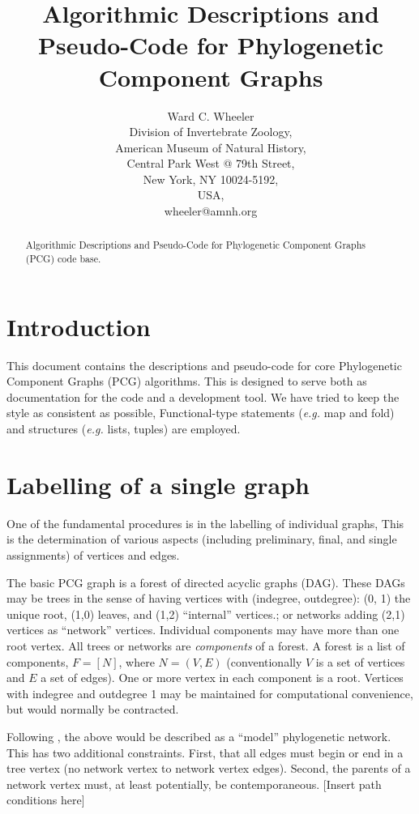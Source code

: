 \documentclass[11pt]{article}
\title{Algorithmic Descriptions and Pseudo-Code for Phylogenetic Component Graphs}
\author{Ward C. Wheeler\\
		Division of Invertebrate Zoology,\\
		American Museum of Natural History,\\
		Central Park West @ 79th Street,\\
		New York, NY 10024-5192,\\
		USA,\\
		wheeler@amnh.org}
\begin{document}
\maketitle
\begin{abstract}
	Algorithmic Descriptions and Pseudo-Code for Phylogenetic Component Graphs (PCG) code base.
\end{abstract}

\section{Introduction} \label{Introduction}
This document contains the descriptions and pseudo-code for core  Phylogenetic Component Graphs (PCG)
algorithms.  This is designed to serve both as documentation for the code and a development tool.  We have tried to keep
the style as consistent as possible,  Functional-type statements (\textit{e.g.} map and fold) and structures (\textit{e.g.} lists, tuples)
are employed.

\section{Labelling of a single graph} \label{Labelling of a single graph}
One of the fundamental procedures is in the labelling of individual graphs,  This is the determination of various 
aspects (including preliminary, final, and single assignments) of vertices and edges.   

The basic PCG graph is a forest of directed acyclic graphs (DAG).  These DAGs may be trees in the sense of having
 vertices with (indegree, outdegree): (0, 1) the unique root, (1,0) leaves, and (1,2) ``internal'' vertices.; or
 networks adding (2,1) vertices as ``network'' vertices.  Individual components may have more than one 
 root vertex.   All trees or networks are \textit{components} of a forest.  A forest
 is a list of components,
 $F = [N]$, where $N = (V, E)$ (conventionally $V$ is a set of vertices and $E$ a set of edges).  One or more vertex in each component is a root.
 Vertices with indegree and outdegree 1 may be maintained for computational convenience, but would normally be contracted.
 
 Following \cite{moretetal2004}, the above would be described as a ``model'' phylogenetic network. This has two additional constraints.
 First, that all edges must begin or end in a tree vertex (no network vertex to network vertex edges).  
 Second,  the parents of a network vertex must, at least potentially, be 
 contemporaneous. [Insert path conditions here]  
 
\end{document}
